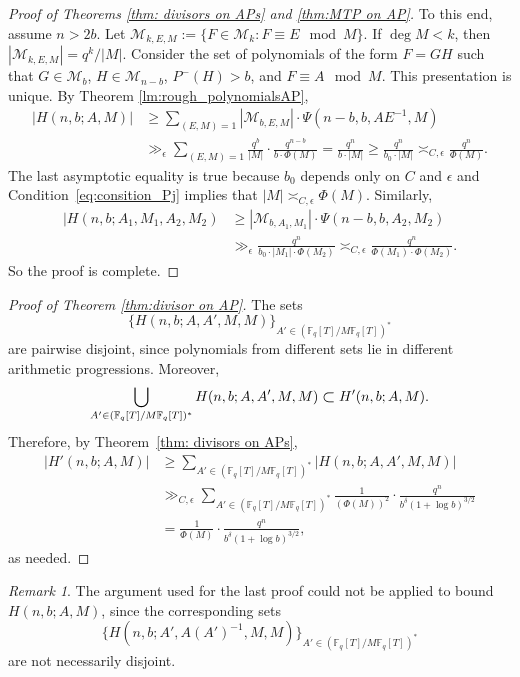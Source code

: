 \documentclass[12pt]{amsart}
\numberwithin{equation}{section}
\theoremstyle{definition}
\theoremstyle{remark}
\newtheorem{remark}{Remark}
\newcommand\bigsubset[1][1.19]{%
   \mathrel{\vcenter{\hbox{\scalebox{#1}{$\subset$}}}}}
\newcommand{\FF}{\mathbb{F}}
\begin{document}
\begin{proof}[Proof of Theorems \ref{thm: divisors on APs} and \ref{thm:MTP on AP}]
    To this end, assume $n>2b$. Let $\mathcal{M}_{k,E,M} := \{F \in \mathcal{M}_k: F \equiv E \mod M\}$. If $\deg M < k$, then $|\mathcal{M}_{k,E,M}| =q^k/|M|$.
    Consider the set of polynomials of the form $F = GH$ such that $G \in \mathcal{M}_{b}$, $H \in \mathcal{M}_{n-b}$, $P^-(H) > b$, and $F \equiv A \mod M$. This presentation is unique. By Theorem \ref{lm:rough_polynomialsAP},
    \begin{align*}
        |H(n,b;A,M)| &\geq \sum_{(E,M)=1} |\mathcal{M}_{b,E,M}| \cdot \Psi(n-b, b, AE^{-1}, M) 
        \\&\gg_{\epsilon} \sum_{(E,M)=1} \frac{q^{b}}{|M|} \cdot \frac{q^{n-b}}{b \cdot \Phi(M)}= \frac{q^n}{b \cdot |M|} 
        \geq \frac{q^n}{b_0 \cdot |M|} \asymp_{C,\epsilon} \frac{q^n}{\Phi(M)}.
    \end{align*}
    The last asymptotic equality is true because $b_0$ depends only on $C$ and $\epsilon$ and  Condition~\ref{eq:consition_Pj} implies that $|M| \asymp_{C, \epsilon} \Phi(M)$.
    Similarly, 
    \begin{align*}
        |H(n,b;A_1,M_1,A_2,M_2) &\geq |\mathcal{M}_{b,A_1,M_1}|\cdot \Psi(n-b, b, A_2, M_2) \\
        &\gg_{\epsilon} \frac{q^n}{b_0 \cdot |M_1| \cdot \Phi(M_2)} \asymp_{C,\epsilon}
        \frac{q^n}{\Phi(M_1) \cdot \Phi(M_2)}.
    \end{align*}
    So the proof is complete.
\end{proof}
\begin{proof} [Proof of Theorem \ref{thm:divisor on AP}]
    The sets
    \[
        \{H(n,b;A,A',M,M)\}_{A'\in(\FF_q[T]/M\FF_q[T])^*}
    \]
    are pairwise disjoint, since polynomials from different sets lie in different arithmetic progressions. Moreover, 
    \[
        \bigcup_{A'\in(\FF_q[T]/M\FF_q[T])^*} H(n,b;A,A',M,M) \bigsubset H'(n,b;A,M).
    \]
    Therefore, by Theorem~\ref{thm: divisors on APs},
    \begin{align*}
        |H'(n,b;A,M)| &\geq \sum_{A'\in(\FF_q[T]/M\FF_q[T])^*} |H(n,b;A,A',M,M)| \\
        &\gg_{C,\epsilon} \sum_{A'\in(\FF_q[T]/M\FF_q[T])^*} \frac{1}{(\Phi(M))^2} \cdot \frac{q^n}{b^\delta (1+\log b)^{3/2}} \\
        &= \frac{1}{\Phi(M)} \cdot \frac{q^n}{b^\delta (1+\log b)^{3/2}},
    \end{align*}
    as needed.
\end{proof}
\begin{remark}
    The argument used for the last proof could not be applied to bound $H(n,b;A,M)$,
    since the corresponding sets 
    \[
        \{H(n,b;A',A(A')^{-1},M,M)\}_{A'\in(\FF_q[T]/M\FF_q[T])^*}
    \]
    are not necessarily disjoint.
\end{remark}
\end{document}
